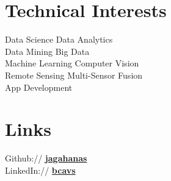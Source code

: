 \documentclass[letterpaper]{deedy-resume} %
\begin{document}
\begin{minipage}[t]{0.30\textwidth}
\sectionspace %



\section{Technical Interests}
Data Science \textbullet{} Data Analytics \\
Data Mining \textbullet{} Big Data \\
Machine Learning \textbullet{} Computer Vision \\
Remote Sensing \textbullet{} Multi-Sensor Fusion \\
App Development 

\sectionspace %


\section{Links} 

Github:// \href{https://github.com/jagahanas}{\bf jagahanas} \\
LinkedIn:// \href{https://www.linkedin.com/in/bcavs/}{\bf bcavs}

%
%

\sectionspace %


\end{minipage}
\end{document}
